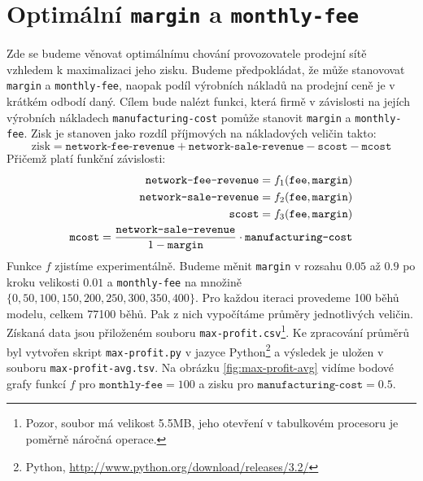 \documentclass[a4wide,12pt]{report}
\begin{document}
\section{Optimální \texttt{margin} a \texttt{monthly-fee}}
Zde se budeme věnovat optimálnímu chování provozovatele prodejní sítě vzhledem k maximalizaci jeho zisku. Budeme předpokládat, že může stanovovat \texttt{margin} a \texttt{monthly-fee}, naopak podíl výrobních nákladů na prodejní ceně je v krátkém odbodí daný. Cílem bude nalézt funkci, která firmě v závislosti na jejích výrobních nákladech \texttt{manufacturing-cost} pomůže stanovit \texttt{margin} a \texttt{monthly-fee}. Zisk je stanoven jako rozdíl příjmových na nákladových veličin takto:
\[ \text{zisk}=\texttt{network-fee-revenue}+\texttt{network-sale-revenue}-\texttt{scost}-\texttt{mcost} \]
Přičemž platí funkční závislosti:
\begin{align}
\texttt{network-fee-revenue}=f_1(\texttt{fee},\texttt{margin})\notag\\
\texttt{network-sale-revenue}=f_2(\texttt{fee},\texttt{margin})\notag\\
\texttt{scost}=f_3(\texttt{fee},\texttt{margin})\notag\\
\texttt{mcost}=\frac{\texttt{network-sale-revenue}}{1-\texttt{margin}}\cdot\texttt{manufacturing-cost}\notag
\end{align}
Funkce $f$ zjistíme experimentálně. Budeme měnit \texttt{margin} v rozsahu $0.05$ až $0.9$ po kroku velikosti $0.01$ a \texttt{monthly-fee} na množině $\{0,50,100,150,200,250,300,350,400\}$. Pro každou iteraci provedeme 100 běhů modelu, celkem 77100 běhů. Pak z nich vypočítáme průměry jednotlivých veličin. Získaná data jsou přiloženém souboru \texttt{max-profit.csv}\footnote{Pozor, soubor má velikost 5.5MB, jeho otevření v tabulkovém procesoru je poměrně náročná operace.}. Ke zpracování průměrů byl vytvořen skript \texttt{max-profit.py} v jazyce Python\footnote{Python, \url{http://www.python.org/download/releases/3.2/}} a výsledek je uložen v souboru \texttt{max-profit-avg.tsv}. Na obrázku \ref{fig:max-profit-avg} vidíme bodové grafy funkcí $f$ pro $\texttt{monthly-fee}=100$ a zisku pro $\texttt{manufacturing-cost}=0.5$. 
\end{document}
